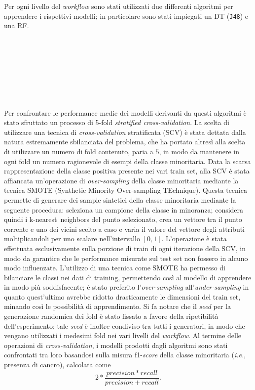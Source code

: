 Per ogni livello del \textit{workflow} sono stati utilizzati due differenti algoritmi per apprendere i rispettivi modelli; in particolare sono stati impiegati un DT (\texttt{J48}) e una RF.
\\\\\\\\\\\\\\\\\\
Per confrontare le performance medie dei modelli derivanti da questi algoritmi è stato sfruttato un processo di 5-fold \textit{stratified cross-validation}.
La scelta di utilizzare una tecnica di \textit{cross-validation} stratificata (SCV) è stata dettata dalla natura estremamente sbilanciata del problema, che ha portato altresì alla scelta di utilizzare un numero di fold contenuto, paria a $5$, in modo da mantenere in ogni fold un numero ragionevole di esempi della classe minoritaria.
Data la scarsa rappresentazione della classe positiva presente nei vari train set, alla SCV è stata affiancata un'operazione di \textit{over-sampling} della classe minoritaria mediante la tecnica SMOTE (Synthetic Minority Over-sampling TEchnique). 
Questa tecnica permette di generare dei sample sintetici della classe minoritaria mediante la seguente procedura: seleziona un campione della classe in minoranza; considera quindi i k-nearest neighbors del punto selezionato, crea un vettore tra il punto corrente e uno dei vicini scelto a caso e varia il valore del vettore degli attributi moltiplicandoli per uno scalare nell'intervallo $[0, 1]$.
L'operazione è stata effettuata esclusivamente sulla porzione di train di ogni iterazione della SCV, in modo da garantire che le performance misurate sul test set non fossero in alcuno modo influenzate.
L'utilizzo di una tecnica come SMOTE ha permesso di bilanciare le classi nei dati di training, permettendo così al modello di apprendere in modo più soddisfacente; è stato preferito l'\textit{over-sampling} all'\textit{under-sampling} in quanto quest'ultimo avrebbe ridotto drasticamente le dimensioni del train set, minando così le possibilità di apprendimento.
Si fa notare che il \textit{seed} per la generazione randomica dei fold è stato fissato a favore della ripetibilità dell'esperimento; tale \textit{seed} è inoltre condiviso tra tutti i generatori, in modo che vengano utilizzati i medesimi fold nei vari livelli del \textit{workflow}.
Al termine delle operazioni di \textit{cross-validation}, i modelli prodotti dagli algoritmi sono stati confrontati tra loro basandosi sulla misura f1-\textit{score} della classe minoritaria (\textit{i.e.}, presenza di cancro), calcolata come \[2 * \frac{precision*recall}{precision+recall}.\]

